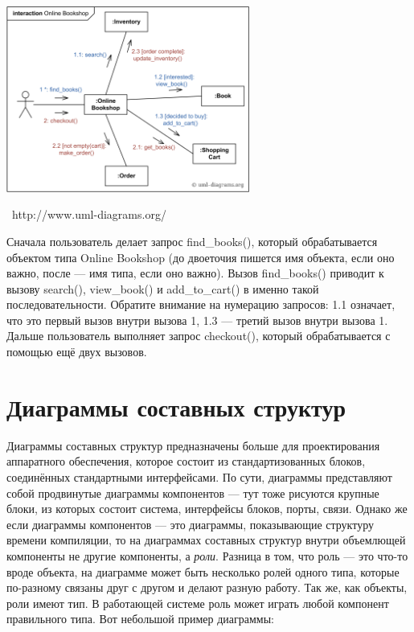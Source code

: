 \documentclass[a5paper]{article}
\newcommand{\attribution}[1] {
    \vspace{-5mm}\begin{flushright}\begin{scriptsize}%
    {\textcopyright\, #1}\end{scriptsize}\end{flushright}
}
\begin{document}
\begin{center}
    \includegraphics[width=0.6\textwidth]{communicationDiagramExample.png}
    \attribution{http://www.uml-diagrams.org/}
\end{center}

Сначала пользователь делает запрос find\_books(), который обрабатывается объектом типа Online Bookshop (до двоеточия пишется имя объекта, если оно важно, после --- имя типа, если оно важно). Вызов find\_books() приводит к вызову search(), view\_book() и add\_to\_cart() в именно такой последовательности. Обратите внимание на нумерацию запросов: 1.1 означает, что это первый вызов внутри вызова 1, 1.3 --- третий вызов внутри вызова 1. Дальше пользователь выполняет запрос checkout(), который обрабатывается с помощью ещё двух вызовов.

\section{Диаграммы составных структур}

Диаграммы составных структур предназначены больше для проектирования аппаратного обеспечения, которое состоит из стандартизованных блоков, соединённых стандартными интерфейсами. По сути, диаграммы представляют собой продвинутые диаграммы компонентов --- тут тоже рисуются крупные блоки, из которых состоит система, интерфейсы блоков, порты, связи. Однако же если диаграммы компонентов --- это диаграммы, показывающие структуру времени компиляции, то на диаграммах составных структур внутри объемлющей компоненты не другие компоненты, а \textit{роли}. Разница в том, что роль --- это что-то вроде объекта, на диаграмме может быть несколько ролей одного типа, которые по-разному связаны друг с другом и делают разную работу. Так же, как объекты, роли имеют тип. В работающей системе роль может играть любой компонент правильного типа. Вот небольшой пример диаграммы:
\end{document}

